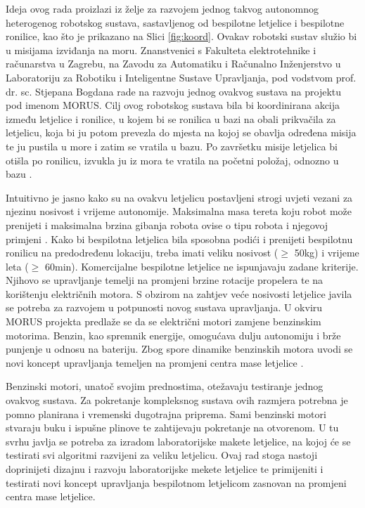 \documentclass[11pt,a4paper]{article}
\begin{document}
Ideja ovog rada proizlazi iz želje za razvojem jednog takvog autonomnog heterogenog robotskog sustava, sastavljenog od bespilotne letjelice i bespilotne ronilice, kao što je prikazano na Slici \ref{fig:koord}. Ovakav robotski sustav služio bi u misijama izviđanja na moru. Znanstvenici s Fakulteta elektrotehnike i računarstva u Zagrebu, na Zavodu za Automatiku i Računalno Inženjerstvo u Laboratoriju za Robotiku i Inteligentne Sustave Upravljanja, pod vodstvom prof. dr. sc. Stjepana Bogdana rade na razvoju jednog ovakvog sustava na projektu pod imenom MORUS. Cilj ovog robotskog sustava bila bi koordinirana akcija između letjelice i ronilice, u kojem bi se ronilica u bazi na obali prikvačila za letjelicu, koja bi ju potom prevezla do mjesta na kojoj se obavlja određena misija te ju pustila u more i zatim se vratila u bazu. Po završetku misije letjelica bi otišla po ronilicu, izvukla ju iz mora te vratila na početni položaj, odnozno u bazu \cite{haus2}.


\medskip


Intuitivno je jasno kako su na ovakvu letjelicu postavljeni strogi uvjeti vezani za njezinu nosivost i vrijeme autonomije. Maksimalna masa tereta koju robot može prenijeti i maksimalna brzina gibanja robota ovise o tipu robota i njegovoj primjeni \cite{kova}. Kako bi bespilotna letjelica bila sposobna podići i prenijeti bespilotnu ronilicu na predodređenu lokaciju, treba imati veliku nosivost ($\geq$ 50kg) i vrijeme leta ($\geq$ 60min). Komercijalne bespilotne letjelice ne ispunjavaju zadane kriterije. Njihovo se upravljanje temelji na promjeni brzine rotacije propelera te na korištenju električnih motora. S obzirom na zahtjev veće nosivosti letjelice javila se potreba za razvojem u potpunosti novog sustava upravljanja. U okviru MORUS projekta predlaže se da se električni motori zamjene benzinskim motorima. Benzin, kao spremnik energije, omogućava dulju autonomiju i brže punjenje u odnosu na bateriju. Zbog spore dinamike benzinskih motora uvodi se novi koncept upravljanja temeljen na promjeni centra mase letjelice \cite{haus1}.

\medskip

Benzinski motori, unatoč svojim prednostima, otežavaju testiranje jednog ovakvog sustava. Za pokretanje kompleksnog sustava ovih razmjera potrebna je pomno planirana i vremenski dugotrajna priprema. Sami benzinski motori stvaraju buku i ispušne plinove te zahtijevaju pokretanje na otvorenom. U tu svrhu javlja se potreba za izradom laboratorijske makete letjelice, na kojoj će se testirati svi algoritmi razvijeni za veliku letjelicu. Ovaj rad stoga nastoji doprinijeti dizajnu i razvoju laboratorijske mekete letjelice te primijeniti i testirati novi koncept upravljanja bespilotnom letjelicom zasnovan na promjeni centra mase letjelice. 
\end{document}
